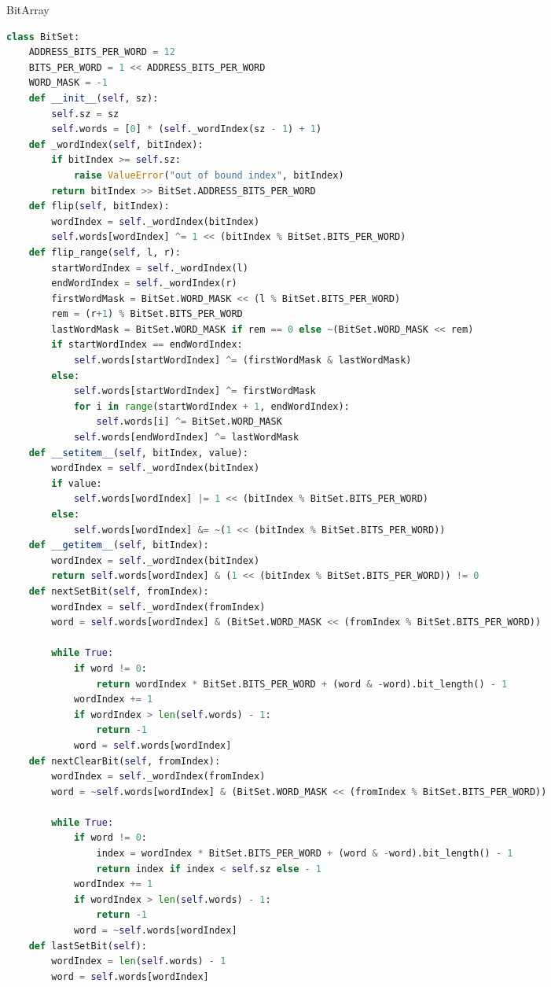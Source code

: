 \documentclass[10pt,landscape, a4paper]{article}
\begin{document}
\begin{multicols*}{3}
BitArray
\begin{lstlisting}[language=Python]
class BitSet:
    ADDRESS_BITS_PER_WORD = 12
    BITS_PER_WORD = 1 << ADDRESS_BITS_PER_WORD
    WORD_MASK = -1
    def __init__(self, sz):
        self.sz = sz
        self.words = [0] * (self._wordIndex(sz - 1) + 1)
    def _wordIndex(self, bitIndex):
        if bitIndex >= self.sz:
            raise ValueError("out of bound index", bitIndex)
        return bitIndex >> BitSet.ADDRESS_BITS_PER_WORD
    def flip(self, bitIndex):
        wordIndex = self._wordIndex(bitIndex)
        self.words[wordIndex] ^= 1 << (bitIndex % BitSet.BITS_PER_WORD)
    def flip_range(self, l, r):
        startWordIndex = self._wordIndex(l)
        endWordIndex = self._wordIndex(r)
        firstWordMask = BitSet.WORD_MASK << (l % BitSet.BITS_PER_WORD)
        rem = (r+1) % BitSet.BITS_PER_WORD
        lastWordMask = BitSet.WORD_MASK if rem == 0 else ~(BitSet.WORD_MASK << rem)
        if startWordIndex == endWordIndex:
            self.words[startWordIndex] ^= (firstWordMask & lastWordMask)
        else:
            self.words[startWordIndex] ^= firstWordMask
            for i in range(startWordIndex + 1, endWordIndex):
                self.words[i] ^= BitSet.WORD_MASK
            self.words[endWordIndex] ^= lastWordMask
    def __setitem__(self, bitIndex, value):
        wordIndex = self._wordIndex(bitIndex)
        if value:
            self.words[wordIndex] |= 1 << (bitIndex % BitSet.BITS_PER_WORD)
        else:
            self.words[wordIndex] &= ~(1 << (bitIndex % BitSet.BITS_PER_WORD))
    def __getitem__(self, bitIndex):
        wordIndex = self._wordIndex(bitIndex)
        return self.words[wordIndex] & (1 << (bitIndex % BitSet.BITS_PER_WORD)) != 0
    def nextSetBit(self, fromIndex):
        wordIndex = self._wordIndex(fromIndex)
        word = self.words[wordIndex] & (BitSet.WORD_MASK << (fromIndex % BitSet.BITS_PER_WORD))

        while True:
            if word != 0:
                return wordIndex * BitSet.BITS_PER_WORD + (word & -word).bit_length() - 1
            wordIndex += 1
            if wordIndex > len(self.words) - 1:
                return -1
            word = self.words[wordIndex]
    def nextClearBit(self, fromIndex):
        wordIndex = self._wordIndex(fromIndex)
        word = ~self.words[wordIndex] & (BitSet.WORD_MASK << (fromIndex % BitSet.BITS_PER_WORD))

        while True:
            if word != 0:
                index = wordIndex * BitSet.BITS_PER_WORD + (word & -word).bit_length() - 1
                return index if index < self.sz else - 1
            wordIndex += 1
            if wordIndex > len(self.words) - 1:
                return -1
            word = ~self.words[wordIndex]
    def lastSetBit(self):
        wordIndex = len(self.words) - 1
        word = self.words[wordIndex]


\end{lstlisting}
\end{multicols*}
\end{document}
